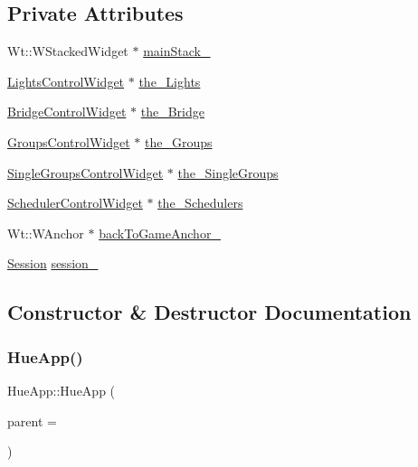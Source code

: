 \subsection*{Private Attributes}
\begin{DoxyCompactItemize}
\item 
Wt\+::\+W\+Stacked\+Widget $\ast$ \hyperlink{class_hue_app_a9ed5493a6b9a1651c8ad035c656d15e5}{main\+Stack\+\_\+}
\item 
\hyperlink{class_lights_control_widget}{Lights\+Control\+Widget} $\ast$ \hyperlink{class_hue_app_af56dcc0d22552d50417533c087816599}{the\+\_\+\+Lights}
\item 
\hyperlink{class_bridge_control_widget}{Bridge\+Control\+Widget} $\ast$ \hyperlink{class_hue_app_a6ec8432c5f76ef8c5799da130d39965c}{the\+\_\+\+Bridge}
\item 
\hyperlink{class_groups_control_widget}{Groups\+Control\+Widget} $\ast$ \hyperlink{class_hue_app_ae8a1698036628944f71e6bb985de7335}{the\+\_\+\+Groups}
\item 
\hyperlink{class_single_groups_control_widget}{Single\+Groups\+Control\+Widget} $\ast$ \hyperlink{class_hue_app_aa13e55cb1398a69aa97a8848d0981637}{the\+\_\+\+Single\+Groups}
\item 
\hyperlink{class_scheduler_control_widget}{Scheduler\+Control\+Widget} $\ast$ \hyperlink{class_hue_app_ae31f2868c0c0123f27ca4d60f7d63c0b}{the\+\_\+\+Schedulers}
\item 
Wt\+::\+W\+Anchor $\ast$ \hyperlink{class_hue_app_a76a68ad13aca8a4d13558ce355f02278}{back\+To\+Game\+Anchor\+\_\+}
\item 
\hyperlink{class_session}{Session} \hyperlink{class_hue_app_a38aedace7f2be9252275e24d8e09f46f}{session\+\_\+}
\end{DoxyCompactItemize}


\subsection{Constructor \& Destructor Documentation}
\mbox{\label{class_hue_app_a34bbbd56837e397473a85d9d6adc99fa}} 
\subsubsection{\texorpdfstring{Hue\+App()}{HueApp()}}
{\footnotesize\ttfamily Hue\+App\+::\+Hue\+App (\begin{DoxyParamCaption}\item[{Wt\+::\+W\+Container\+Widget $\ast$}]{parent = {} }\end{DoxyParamCaption})}



